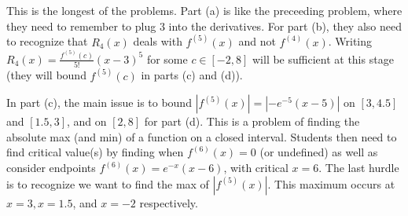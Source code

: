 \documentclass[handout,instructornotes]{ximera}
\begin{document}
\begin{instructorNotes}
This is the longest of the problems.  
Part (a) is like the preceeding problem, where they need to remember to plug $3$ into the derivatives.  
For part (b), they also need to recognize that $R_4(x)$ deals with $f^{(5)}(x)$ and not $f^{(4)}(x)$.  
Writing $R_4(x) = \frac{f^{(5)}(c)}{5!} (x-3)^5$ for some $c \in [-2,8]$ will be sufficient at this stage (they will bound $f^{(5)}(c)$ in parts (c) and (d)).  

In part (c), the main issue is to bound $|f^{(5)}(x)| = |-e^{-5}(x-5)|$ on $[3,4.5]$ and $[1.5,3]$, and on $[2,8]$ for part (d).  
This is a problem of finding the absolute max (and min) of a function on a closed interval.  
Students then need to find critical value(s) by finding when $f^{(6)}(x) = 0$ (or undefined) as well as consider endpoints $f^{(6)}(x) = e^{-x}(x-6)$, with critical $x=6$.  
The last hurdle is to recognize we want to find the max of $|f^{(5)}(x)|$.  
This maximum occurs at $x=3, x=1.5$, and $x=-2$ respectively.
\end{instructorNotes}
















	
	
	
	
	
	
	
	
	

	










								
				
				
	
\end{document}
